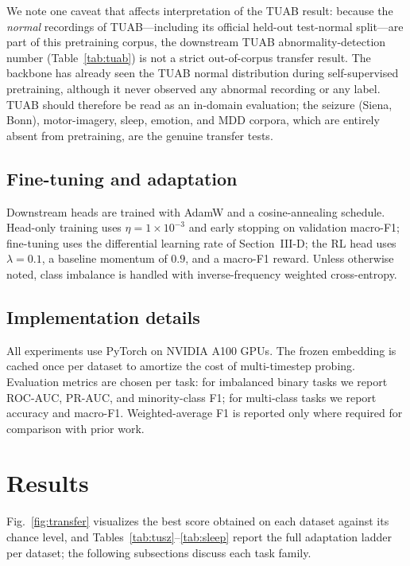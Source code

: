 \documentclass[journal]{IEEEtran}
\begin{document}
We note one caveat that affects interpretation of the TUAB result: because the
\emph{normal} recordings of TUAB---including its official held-out test-normal
split---are part of this pretraining corpus, the downstream TUAB
abnormality-detection number (Table~\ref{tab:tuab}) is not a strict
out-of-corpus transfer result. The backbone has already seen the TUAB normal
distribution during self-supervised pretraining, although it never observed any
abnormal recording or any label. TUAB should therefore be read as an in-domain
evaluation; the seizure (Siena, Bonn), motor-imagery, sleep, emotion, and MDD
corpora, which are entirely absent from pretraining, are the genuine transfer
tests.

\subsection{Fine-tuning and adaptation}
Downstream heads are trained with AdamW and a cosine-annealing schedule. Head-only
training uses $\eta=1\times10^{-3}$ and early stopping on validation macro-F1;
fine-tuning uses the differential learning rate of Section~III-D; the RL head
uses $\lambda=0.1$, a baseline momentum of $0.9$, and a macro-F1 reward. Unless
otherwise noted, class imbalance is handled with inverse-frequency weighted
cross-entropy.

\subsection{Implementation details}
All experiments use PyTorch on NVIDIA A100 GPUs. The frozen embedding is cached
once per dataset to amortize the cost of multi-timestep probing. Evaluation
metrics are chosen per task: for imbalanced binary tasks we report ROC-AUC,
PR-AUC, and minority-class F1; for multi-class tasks we report accuracy and
macro-F1. Weighted-average F1 is reported only where required for comparison
with prior work.

\section{Results}
Fig.~\ref{fig:transfer} visualizes the best score obtained on each dataset
against its chance level, and Tables~\ref{tab:tusz}--\ref{tab:sleep} report the
full adaptation ladder per dataset; the following subsections discuss each task
family.
\end{document}
